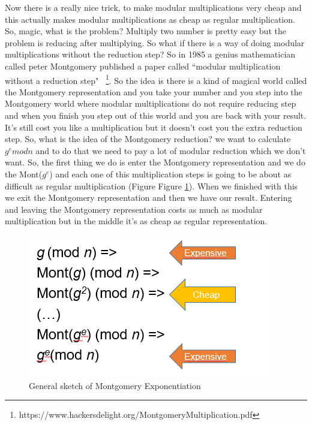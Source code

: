 Now there is a really nice trick, to make modular multiplications very cheap and this actually makes modular multiplications as cheap as regular multiplication. So, magic, what is the problem? Multiply two number is pretty easy but the problem is reducing after multiplying. So what if there is a way of doing modular multiplications without the reduction step? So in 1985 a genius mathematician called peter Montgomery published a paper called ``modular multiplication without a reduction step" ~\cite{warren2013hacker}\footnote{https://www.hackersdelight.org/MontgomeryMultiplication.pdf}. So the idea is there is a kind of magical world called the Montgomery representation and you take your number and you step into the Montgomery world where modular multiplications do not require reducing step and when you finish you step out of this world and you are back with your result. It's still cost you like a multiplication but it doesn't cost you the extra reduction step.
So, what is the idea of the Montgomery reduction? we want to calculate \(g^emodn\) and to do that we need to pay a lot of modular reduction which we  don't want. So, the first thing we do is enter the Montgomery representation and we do the Mont(\(g^e\)) and each one of this multiplication steps is going to be about as difficult as regular multiplication (Figure Figure \ref{montg:fig}). When we  finished with this we exit the Montgomery representation and then we have our result. Entering and leaving the Montgomery representation costs as much as modular multiplication but in the middle it's as cheap as regular representation.

\begin{figure}[!ht]
    \centering
    \includegraphics[scale=0.7]{images/montg.PNG}
    \caption{General sketch of Montgomery Exponentiation} \label{montg:fig}
\end{figure}

